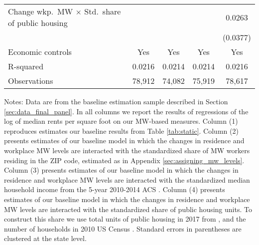 \begin{table}[hbt!]
\begin{tabular}{@{}lcccc@{}}
        Change wkp.\ MW $\times$ Std.\ share of public housing &        &       &        &  0.0263   \\
                                                               &        &       &        & (0.0377)  \\ \midrule
        Economic controls                                      &  Yes   &  Yes  &   Yes  &  Yes   \\
        R-squared                                              &  0.0216   &  0.0214  &   0.0214  &  0.0216   \\
        Observations                                           &  78,912  &  74,082 &   75,919 &  78,617  \\ \bottomrule
    \end{tabular}

    \begin{minipage}{.95\linewidth} \footnotesize
        \vspace{2mm}
        Notes: 
        Data are from the baseline estimation sample described in Section 
        \ref{sec:data_final_panel}.
        In all columns we report the results of regressions of the log of median 
        rents per square foot on our MW-based measures.
        Column (1) reproduces estimates our baseline results from Table 
        \ref{tab:static}.
        Column (2) presents estimates of our baseline model in which the changes
        in residence and workplace MW levels are interacted with the 
        standardized share of MW workers residing in the ZIP code, estimated 
        as in Appendix \ref{sec:assigning_mw_levels}.
        Column (3) presents estimates of our baseline model in which the changes
        in residence and workplace MW levels are interacted with the 
        standardized median household income from the 5-year 2010-2014 ACS 
        \parencite{CensusACS}.
        Column (4) presents estimates of our baseline model in which the changes
        in residence and workplace MW levels are interacted with the 
        standardized share of public housing units.
        To construct this share we use total units of public housing in 2017 
        from \textcite{hudHousing}, and the number of households in 2010 US 
        Census \parencite{CensusDecennial}.
        Standard errors in parentheses are clustered at the state level.
    \end{minipage}
\end{table}
